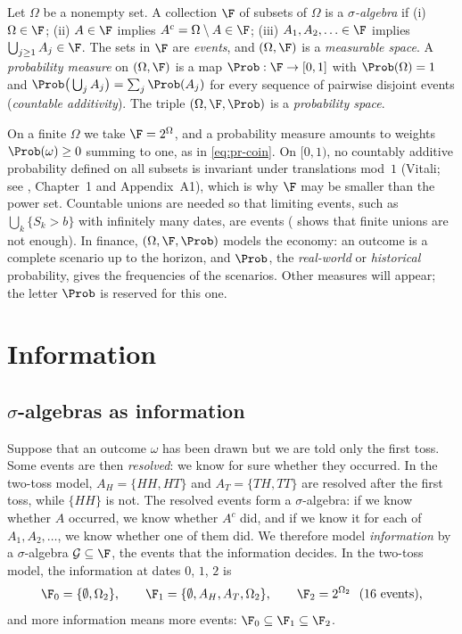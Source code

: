 \begin{definition}\label{def:pr-sigma-algebra}
Let $\Omega$ be a nonempty set. A collection $\F$ of subsets of $\Omega$ is a
\emph{$\sigma$-algebra} if (i) $\Omega\in\F$; (ii) $A\in\F$ implies $A^c=\Omega\setminus
A\in\F$; (iii) $A_1,A_2,\ldots\in\F$ implies $\bigcup_{j\ge1}A_j\in\F$. The sets in $\F$
are \emph{events}, and $(\Omega,\F)$ is a \emph{measurable space}. A \emph{probability
measure} on $(\Omega,\F)$ is a map $\Prob:\F\to[0,1]$ with $\Prob(\Omega)=1$ and
$\Prob\big(\bigcup_jA_j\big)=\sum_j\Prob(A_j)$ for every sequence of pairwise disjoint events
(\emph{countable additivity}). The triple $(\Omega,\F,\Prob)$ is a \emph{probability space}.
\end{definition}

On a finite $\Omega$ we take $\F=2^\Omega$, and a probability measure amounts to weights
$\Prob(\omega)\ge0$ summing to one, as in \eqref{eq:pr-coin}. On $[0,1)$, no countably
additive probability defined on all subsets is invariant under translations mod~$1$ (Vitali;
see \textcite{williams}, Chapter~1 and Appendix~A1), which is why $\F$ may be smaller than
the power set. Countable unions are needed so that limiting events, such as
$\bigcup_k\{S_k>b\}$ with infinitely many dates, are events ( shows
that finite unions are not enough). In finance, $(\Omega,\F,\Prob)$
models the economy: an outcome is a complete scenario up to the horizon, and $\Prob$, the
\emph{real-world} or \emph{historical} probability, gives the frequencies of the
scenarios. Other measures will appear; the letter $\Prob$ is reserved for this one.

\section{Information}\label{sec:pr-information}

\subsection{\texorpdfstring{$\sigma$}{Sigma}-algebras as information}

Suppose that an outcome $\omega$ has been drawn but we are told only the first toss. Some
events are then \emph{resolved}: we know for sure whether they occurred. In the two-toss
model, $A_H=\{HH,HT\}$ and $A_T=\{TH,TT\}$ are resolved after the first toss, while
$\{HH\}$ is not. The resolved events form a $\sigma$-algebra: if we know whether $A$
occurred, we know whether $A^c$ did, and if we know it for each of $A_1,A_2,\ldots$, we
know whether one of them did. We therefore model \emph{information} by a $\sigma$-algebra
$\mathcal G\subseteq\F$, the events that the information decides. In the two-toss model,
the information at dates $0$, $1$, $2$ is
\[
  \F_0=\{\emptyset,\Omega_2\},\qquad
  \F_1=\{\emptyset,A_H,A_T,\Omega_2\},\qquad
  \F_2=2^{\Omega_2}\ \ (16\text{ events}),
\]
and more information means more events: $\F_0\subseteq\F_1\subseteq\F_2$.

